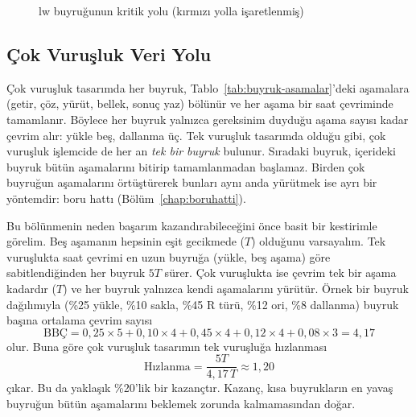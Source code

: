 \begin{figure}[htbp]
\caption{lw buyruğunun kritik yolu (kırmızı yolla işaretlenmiş)}
\label{fig:kritik-yol-lw}
\end{figure}

\subsection{Çok Vuruşluk Veri Yolu}
\label{subsec:cok-vurusluk-veriyolu}

Çok vuruşluk tasarımda her buyruk, Tablo~\ref{tab:buyruk-asamalar}'deki aşamalara (getir, çöz, yürüt, bellek, sonuç yaz) bölünür ve her aşama bir saat çevriminde tamamlanır. Böylece her buyruk yalnızca gereksinim duyduğu aşama sayısı kadar çevrim alır: yükle beş, dallanma üç. Tek vuruşluk tasarımda olduğu gibi, çok vuruşluk işlemcide de her an \emph{tek bir buyruk} bulunur. Sıradaki buyruk, içerideki buyruk bütün aşamalarını bitirip tamamlanmadan başlamaz. Birden çok buyruğun aşamalarını örtüştürerek bunları aynı anda yürütmek ise ayrı bir yöntemdir: boru hattı (Bölüm~\ref{chap:boruhatti}).

Bu bölünmenin neden başarım kazandırabileceğini önce basit bir kestirimle görelim. Beş aşamanın hepsinin eşit gecikmede ($T$) olduğunu varsayalım. Tek vuruşlukta saat çevrimi en uzun buyruğa (yükle, beş aşama) göre sabitlendiğinden her buyruk $5T$ sürer. Çok vuruşlukta ise çevrim tek bir aşama kadardır ($T$) ve her buyruk yalnızca kendi aşamalarını yürütür. Örnek bir buyruk dağılımıyla (\%25 yükle, \%10 sakla, \%45 R türü, \%12 ori, \%8 dallanma) buyruk başına ortalama çevrim sayısı
\[
\text{BBÇ} = 0{,}25\times5 + 0{,}10\times4 + 0{,}45\times4 + 0{,}12\times4 + 0{,}08\times3 = 4{,}17
\]
olur. Buna göre çok vuruşluk tasarımın tek vuruşluğa hızlanması
\[
\text{Hızlanma} = \frac{5T}{4{,}17\,T} \approx 1{,}20
\]
çıkar. Bu da yaklaşık \%20'lik bir kazançtır. Kazanç, kısa buyrukların en yavaş buyruğun bütün aşamalarını beklemek zorunda kalmamasından doğar.

